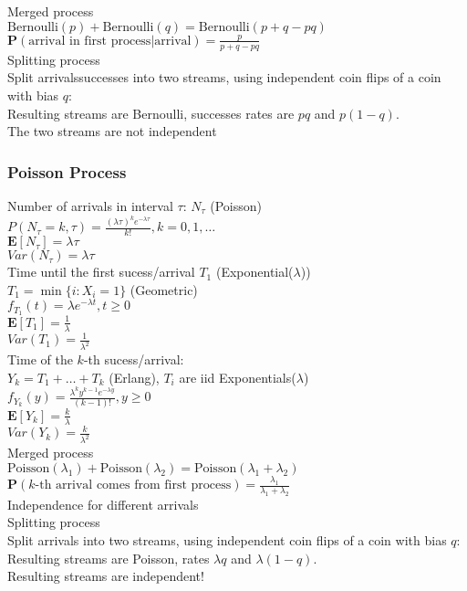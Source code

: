 Merged process\\
$\text{Bernoulli}(p) + \text{Bernoulli}(q) = \text{Bernoulli}(p+q-pq)$\\
$\mathbf{P}(\text{arrival in first process} | \text{arrival}) = \frac{p}{p+q-pq}$\\

Splitting process\\
Split arrivalssuccesses into two streams, using independent coin flips of a coin with bias $q$:\\
Resulting streams are Bernoulli, successes rates are $pq$ and $p(1-q)$.\\
The two streams are not independent\\

\subsubsection*{Poisson Process}

Number of arrivals in interval $\tau$: $N_\tau$ (Poisson)\\
$P(N_\tau = k, \tau) = \frac{(\lambda \tau)^k e^{-\lambda \tau}}{k!}, k=0, 1, \ldots$\\
$\mathbf{E}[N_\tau] = \lambda\tau$\\
$Var(N_\tau) = \lambda\tau$\\

Time until the first sucess/arrival $T_1$ (Exponential($\lambda$))\\
$T_1 = \min\lbrace i: X_i = 1\rbrace$ (Geometric)\\
$f_{T_1}(t) = \lambda e^{-\lambda t}, t \geq 0$\\
$\mathbf{E}[T_1] = \frac{1}{\lambda}$\\
$Var(T_1) = \frac{1}{\lambda^2}$\\

Time of the $k$-th sucess/arrival:\\
$Y_k = T_1 + \ldots + T_k$ (Erlang), $T_i$ are iid Exponentials($\lambda$)\\
$f_{Y_k}(y) = \frac{\lambda^k y^{k-1} e^{-\lambda y}}{(k-1)!}, y \geq 0$\\
$\mathbf{E}[Y_k] = \frac{k}{\lambda}$\\
$Var(Y_k) = \frac{k}{\lambda^2}$\\

Merged process\\
$\text{Poisson}(\lambda_1) + \text{Poisson}(\lambda_2) = \text{Poisson}(\lambda_1+\lambda_2)$\\
$\mathbf{P}(k\text{-th arrival comes from first process}) = \frac{\lambda_1}{\lambda_1+\lambda_2}$\\
Independence for different arrivals\\

Splitting process\\
Split arrivals into two streams, using independent coin flips of a coin with bias $q$:\\
Resulting streams are Poisson, rates $\lambda q$ and $\lambda (1-q)$.\\
Resulting streams are independent!